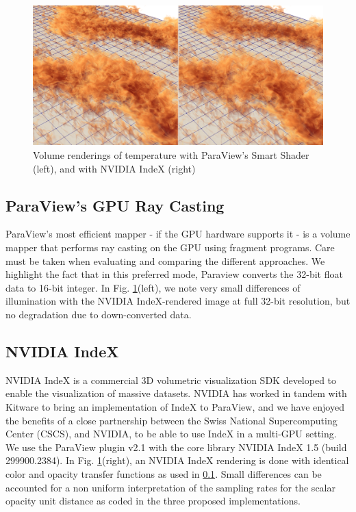 \documentclass[final,5p,times,twocolumn]{elsarticle}
\begin{document}
\begin{figure}
	\centering
	\includegraphics[width=\linewidth]{fig2}%
	\caption{\label{fig:gpucloseup} Volume renderings of temperature with ParaView's
Smart Shader (left), and with NVIDIA IndeX (right)}
\end{figure}

\subsection{ParaView's GPU Ray Casting} \label{smart}

ParaView's most efficient mapper - if the GPU hardware supports it - is a volume
mapper that performs ray casting on the GPU using fragment programs. Care must
be taken when evaluating and comparing the different approaches. We highlight the
fact that in this preferred mode, Paraview converts the 32-bit float data to 16-bit
integer. In Fig. \ref{fig:gpucloseup}(left), we note very small differences of illumination with the
NVIDIA IndeX-rendered image at full 32-bit resolution,
but no degradation due to down-converted data.

\subsection{NVIDIA IndeX} \label{index}

NVIDIA IndeX\cite{NVIDIAIndeX} is a commercial 3D volumetric visualization SDK developed to enable
the visualization of massive datasets. NVIDIA has worked in tandem with Kitware to
bring an implementation of IndeX to ParaView, and we have enjoyed the benefits
of a close partnership between the Swiss National Supercomputing Center (CSCS),
and NVIDIA, to be able to use IndeX in a multi-GPU setting. We use the ParaView
plugin v2.1 with the core library NVIDIA IndeX 1.5 (build 299900.2384). In
Fig. \ref{fig:gpucloseup}(right), an NVIDIA IndeX rendering is done with identical
color and opacity transfer functions as used in \ref{smart}.
Small differences can be accounted for a non uniform interpretation of the sampling rates
for the scalar opacity unit distance as coded in the three proposed implementations.
\end{document}
